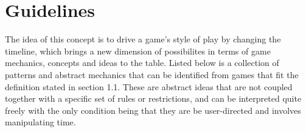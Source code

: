 
\chapter{Guidelines}

The idea of this concept is to drive a game's style of play by changing the timeline, which brings a new dimension of possibilites in terms of game mechanics, concepts and ideas to the table. Listed below is a collection of patterns and abstract mechanics that can be identified from games that fit the definition stated in section 1.1. These are abstract ideas that are not coupled together with a specific set of rules or restrictions, and can be interpreted quite freely with the only condition being that they are be user-directed and involves manipulating time. 


